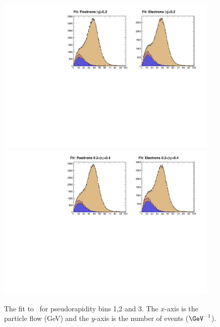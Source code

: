 \begin{figure}[htb]
\begin{center}
\includegraphics[width=0.95\textwidth]{data_0.pdf} \\
\includegraphics[width=0.95\textwidth]{data_1.pdf} \\
\caption[The fit to \MET for pseudorapidity bins 1 and 2.]
{\label{fig:data1} The fit to \MET\ for pseudorapidity bins 1,2 and
3.  The $x$-axis is the particle flow \ETm (GeV) and the $y$-axis is the number
of events ($\GeV^{-1}$).}
\end{center}
\end{figure}

